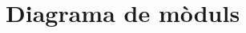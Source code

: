 \documentclass[11pt]{article}
\begin{document}
	\section*{Diagrama de mòduls}
%				
%		
%		
%		
%		
%		
%		
%		
%		
%				
\end{document}
